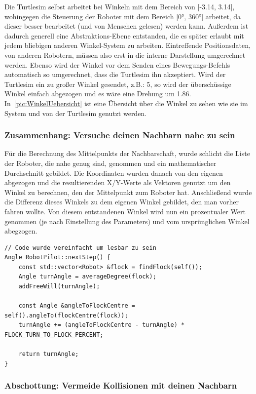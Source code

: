 Die Turtlesim selbst arbeitet bei Winkeln mit dem Bereich von [-3.14, 3.14], wohingegen die Steuerung der Roboter mit dem Bereich [0°, 360°] arbeitet, da dieser besser bearbeitet (und von Menschen gelesen) werden kann. Außerdem ist dadurch generell eine Abstraktions-Ebene entstanden, die es später erlaubt mit jedem bliebigen anderen Winkel-System zu arbeiten.
Eintreffende Positionsdaten, von anderen Robotern, müssen also erst in die interne Darstellung umgerechnet werden. Ebenso wird der Winkel vor dem Senden eines Bewegungs-Befehls automatisch so umgerechnet, dass die Turtlesim ihn akzeptiert. Wird der Turtlesim ein zu großer Winkel gesendet, z.B.: 5, so wird der überschüssige Winkel einfach abgezogen und es wäre eine Drehung um 1.86. In~\autoref{pic:WinkelUebersicht} ist eine Übersicht über die Winkel zu sehen wie sie im System und von der Turtlesim genutzt werden.
 
\subsubsection*{Zusammenhang: Versuche deinen Nachbarn nahe zu sein}

Für die Berechnung des Mittelpunkts der Nachbarschaft, wurde schlicht die Liste der Roboter, die nahe genug sind, genommen und ein mathematischer Durchschnitt gebildet. Die Koordinaten wurden danach von den eigenen abgezogen und die resultierenden X/Y-Werte als Vektoren genutzt um den Winkel zu berechnen, den der Mittelpunkt zum Roboter hat. Anschließend wurde die Differenz dieses Winkels zu dem eigenen Winkel gebildet, den man vorher fahren wollte.
Von diesem entstandenen Winkel wird nun ein prozentualer Wert genommen (je nach Einstellung des Parameters) und vom ursprünglichen Winkel abegzogen.

\begin{lstlisting}[style=cpp, title=Berechnung des Fahrtwinkels]
// Code wurde vereinfacht um lesbar zu sein
Angle RobotPilot::nextStep() {
	const std::vector<Robot> &flock = findFlock(self());
	Angle turnAngle = averageDegree(flock);
	addFreeWill(turnAngle);

	const Angle &angleToFlockCentre = self().angleTo(flockCentre(flock));
	turnAngle += (angleToFlockCentre - turnAngle) * FLOCK_TURN_TO_FLOCK_PERCENT;

	return turnAngle;
}
\end{lstlisting}

\subsubsection*{Abschottung: Vermeide Kollisionen mit deinen Nachbarn}

